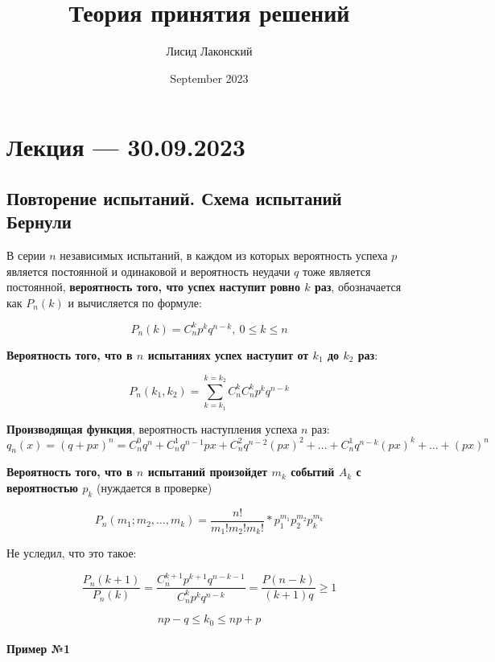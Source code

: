 \documentclass{article}
\title{Теория принятия решений}
\author{Лисид Лаконский}
\date{September 2023}
\begin{document}
\raggedright

\maketitle

\tableofcontents
\pagebreak

\section{Лекция — 30.09.2023}

\subsection{Повторение испытаний. Схема испытаний Бернули}

В серии $n$ независимых испытаний, в каждом из которых вероятность успеха $p$ является постоянной и одинаковой и вероятность неудачи $q$ тоже является постоянной, \textbf{вероятность того, что успех наступит ровно $k$ раз}, обозначается как $P_{n}(k)$ и вычисляется по формуле:

$$P_{n}(k) = C_{n}^{k} p^{k} q^{n - k}, \ 0 \le k \le n$$

\textbf{Вероятность того, что в $n$ испытаниях успех наступит от $k_{1}$ до $k_{2}$ раз}:

$$P_{n}(k_1, k_2) = \sum\limits_{k = k_1}^{k = k_2} C_{n}^{k} C_{n}^{k} p^{k} q^{n - k}$$

\textbf{Производящая функция}, вероятность наступления успеха $n$ раз: $q_{n}(x) = (q + px)^{n} = C_{n}^{0} q^{n} + C_{n}^{1} q^{n - 1} p x + C_{n}^{2} q^{n - 2} (p x)^{2} + \dots + C_{n}^{1} q^{n - k} (p x)^{k} + \dots + (p x)^{n}$

\textbf{Вероятность того, что в $n$ испытаний произойдет $m_{k}$ событий $A_{k}$ с вероятностью $p_{k}$} (нуждается в проверке)

$$P_{n}(m_1; m_2, \dots, m_k) = \frac{n!}{m_{1}! m_{2}! m_{k}!} * p_{1}^{m_1} p_{2}^{m_2} p_{k}^{m_k}$$

Не уследил, что это такое:

$$\frac{P_{n}(k + 1)}{P_{n}(k)} = \frac{C_{n}^{k + 1} p^{k + 1} q^{n - k - 1}}{C_{n}^{k} p^{k} q^{n - k}} = \frac{P(n - k)}{(k + 1) q} \ge 1$$

$$np - q \le k_0 \le np + p$$

\paragraph{Пример №1}
\end{document}
